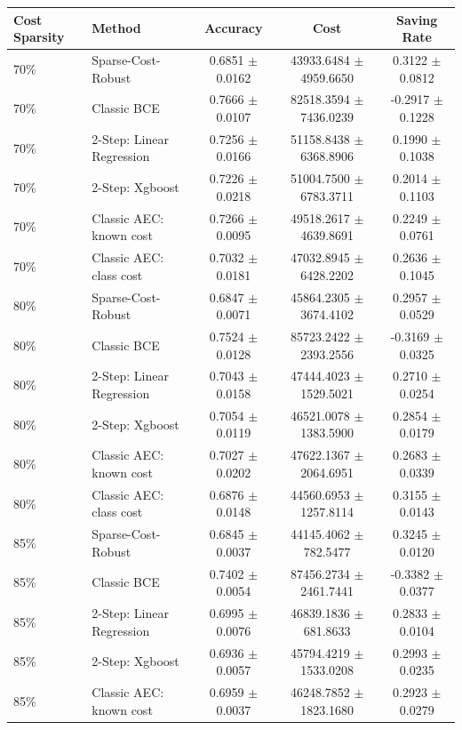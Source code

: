 \begin{tabular}{l l c c c}
\toprule
Cost Sparsity & Method & Accuracy & Cost & Saving Rate \\
\midrule
70\%  & Sparse-Cost-Robust & 0.6851 $\pm$ 0.0162 & 43933.6484 $\pm$ 4959.6650 & 0.3122 $\pm$ 0.0812 \\
70\%  & Classic BCE & 0.7666 $\pm$ 0.0107 & 82518.3594 $\pm$ 7436.0239 & -0.2917 $\pm$ 0.1228 \\
70\%  & 2-Step: Linear Regression & 0.7256 $\pm$ 0.0166 & 51158.8438 $\pm$ 6368.8906 & 0.1990 $\pm$ 0.1038 \\
70\%  & 2-Step: Xgboost & 0.7226 $\pm$ 0.0218 & 51004.7500 $\pm$ 6783.3711 & 0.2014 $\pm$ 0.1103 \\
70\%  & Classic AEC: known cost & 0.7266 $\pm$ 0.0095 & 49518.2617 $\pm$ 4639.8691 & 0.2249 $\pm$ 0.0761 \\
70\%  & Classic AEC: class cost & 0.7032 $\pm$ 0.0181 & 47032.8945 $\pm$ 6428.2202 & 0.2636 $\pm$ 0.1045 \\
\midrule
80\%  & Sparse-Cost-Robust & 0.6847 $\pm$ 0.0071 & 45864.2305 $\pm$ 3674.4102 & 0.2957 $\pm$ 0.0529 \\
80\%  & Classic BCE & 0.7524 $\pm$ 0.0128 & 85723.2422 $\pm$ 2393.2556 & -0.3169 $\pm$ 0.0325 \\
80\%  & 2-Step: Linear Regression & 0.7043 $\pm$ 0.0158 & 47444.4023 $\pm$ 1529.5021 & 0.2710 $\pm$ 0.0254 \\
80\%  & 2-Step: Xgboost & 0.7054 $\pm$ 0.0119 & 46521.0078 $\pm$ 1383.5900 & 0.2854 $\pm$ 0.0179 \\
80\%  & Classic AEC: known cost & 0.7027 $\pm$ 0.0202 & 47622.1367 $\pm$ 2064.6951 & 0.2683 $\pm$ 0.0339 \\
80\%  & Classic AEC: class cost & 0.6876 $\pm$ 0.0148 & 44560.6953 $\pm$ 1257.8114 & 0.3155 $\pm$ 0.0143 \\
\midrule
85\%  & Sparse-Cost-Robust & 0.6845 $\pm$ 0.0037 & 44145.4062 $\pm$ 782.5477 & 0.3245 $\pm$ 0.0120 \\
85\%  & Classic BCE & 0.7402 $\pm$ 0.0054 & 87456.2734 $\pm$ 2461.7441 & -0.3382 $\pm$ 0.0377 \\
85\%  & 2-Step: Linear Regression & 0.6995 $\pm$ 0.0076 & 46839.1836 $\pm$ 681.8633 & 0.2833 $\pm$ 0.0104 \\
85\%  & 2-Step: Xgboost & 0.6936 $\pm$ 0.0057 & 45794.4219 $\pm$ 1533.0208 & 0.2993 $\pm$ 0.0235 \\
85\%  & Classic AEC: known cost & 0.6959 $\pm$ 0.0037 & 46248.7852 $\pm$ 1823.1680 & 0.2923 $\pm$ 0.0279 \\

\end{tabular}
